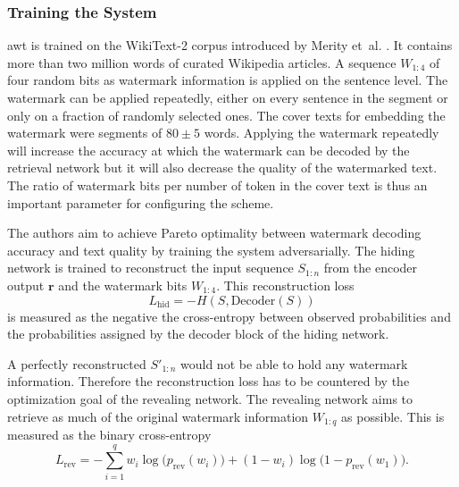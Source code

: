     \subsubsection{Training the System}
    \ac{awt} is trained on the WikiText-2 corpus introduced by Merity et~al. \cite{merity2016pointer}.
    It contains more than two million words of curated Wikipedia articles.
    A sequence $W_{1:4}$ of four random bits as watermark information is applied on the sentence level.
    The watermark can be applied repeatedly, either on every sentence in the segment or only on a fraction of randomly selected ones.
    The cover texts for embedding the watermark were segments of $80 \pm 5$ words.
    Applying the watermark repeatedly will increase the accuracy at which the watermark can be decoded by the retrieval network but it will also decrease the quality of the watermarked text.
    The ratio of watermark bits per number of token in the cover text is thus an important parameter for configuring the scheme.

    The authors aim to achieve Pareto optimality between watermark decoding accuracy and text quality by training the system adversarially.
    The hiding network is trained to reconstruct the input sequence $S_{1:n}$ from the encoder output $\mathbf{r}$ and the watermark bits $W_{1:4}$.
    This reconstruction loss 
    \begin{equation}
        L_{\mathrm{hid}} = - H(S,\mathrm{Decoder}(S))
    \end{equation}
    is measured as the negative the cross-entropy between observed probabilities and the probabilities assigned by the decoder block of the hiding network.
    
    A perfectly reconstructed $S'_{1:n}$ would not be able to hold any watermark information.
    Therefore the reconstruction loss has to be countered by the optimization goal of the revealing network.
    The revealing network aims to retrieve as much of the original watermark information $W_{1:q}$ as possible.
    This is measured as the binary cross-entropy
    \begin{equation}
        L_{\mathrm{rev}} = - \sum_{i=1}^q w_i \log \big( p_{\mathrm{rev}}(w_i) \big) + (1 - w_i) \log \big( 1 - p_{\mathrm{rev}}(w_1) \big) \text{.}
    \end{equation}

